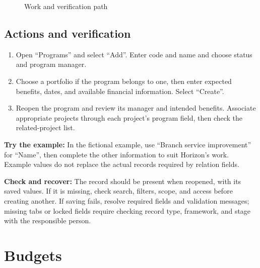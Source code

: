 \begin{figure}[H]
\centering
{}
\rclegend
\caption{Work and verification path}
\label{fig:projects-programs-flow}
\end{figure}

\subsection{Actions and verification}
\begin{enumerate}
\item Open “Programs” and select “Add”. Enter code and name and choose status and program manager.
\item Choose a portfolio if the program belongs to one, then enter expected benefits, dates, and available financial information. Select “Create”.
\item Reopen the program and review its manager and intended benefits. Associate appropriate projects through each project’s program field, then check the related-project list.
\end{enumerate}

\textbf{Try the example:} In the fictional example, use “Branch service improvement” for “Name”, then complete the other information to suit Horizon's work. Example values do not replace the actual records required by relation fields.

\textbf{Check and recover:} The record should be present when reopened, with its saved values. If it is missing, check search, filters, scope, and access before creating another. If saving fails, resolve required fields and validation messages; missing tabs or locked fields require checking record type, framework, and stage with the responsible person.

\clearpage
\section{Budgets}
\label{sec:projects-feature-budgets}

